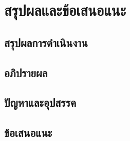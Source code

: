 \chapter{สรุปผลและข้อเสนอแนะ}
\section{สรุปผลการดำเนินงาน}
\BlankBody
\section{อภิปรายผล}
\BlankBody
\section{ปัญหาและอุปสรรค}
\BlankBody
\section{ข้อเสนอแนะ}
\BlankBody
